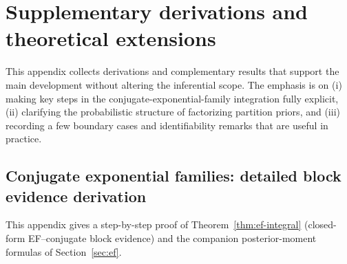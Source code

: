 \section{Supplementary derivations and theoretical extensions}
\label{sec:appendix}

This appendix collects derivations and complementary results that support the main development
without altering the inferential scope.
The emphasis is on (i) making key steps in the conjugate-exponential-family integration fully
explicit, (ii) clarifying the probabilistic structure of factorizing partition priors, and (iii)
recording a few boundary cases and identifiability remarks that are useful in practice.

\subsection{Conjugate exponential families: detailed block evidence derivation}
\label{app:conjugate}

This appendix gives a step-by-step proof of Theorem~\ref{thm:ef-integral} (closed-form
EF--conjugate block evidence) and the companion posterior-moment formulas of
Section~\ref{sec:ef}.

